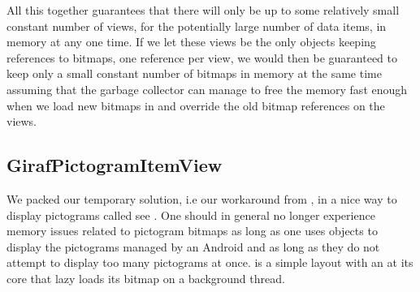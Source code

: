 All this together guarantees that there will only be up to some relatively small constant number of views, for the potentially large number of data items, in memory at any one time. If we let these views be the only objects keeping references to bitmaps, one reference per view, we would then be guaranteed to keep only a small constant number of bitmaps in memory at the same time assuming that the garbage collector can manage to free the memory fast enough when we load new bitmaps in and override the old bitmap references on the views. 

\subsection{GirafPictogramItemView}
We packed our temporary solution, i.e our workaround from , in a nice way to display pictograms called  see . One should in general no longer experience memory issues related to pictogram bitmaps as long as one uses  objects to display the pictograms managed by an Android  and as long as they do not attempt to display too many pictograms at once.  is a simple layout with an  at its core that lazy loads its bitmap on a background thread.